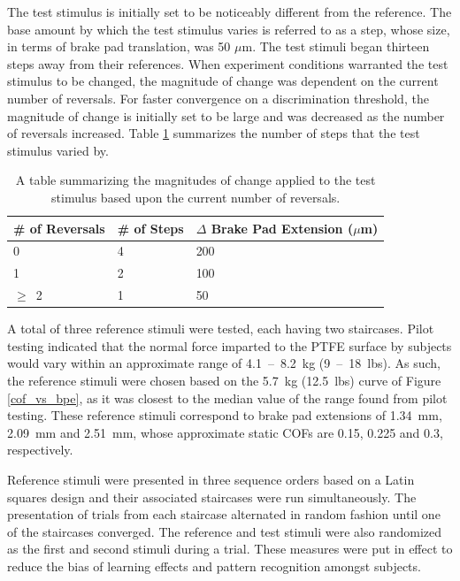 \documentclass [12pt,letterpaper]{report}
\begin{document}
The test stimulus is initially set to be noticeably different from the reference. The base amount by which the test stimulus varies is referred to as a step, whose size, in terms of brake pad translation, was 50 $\mu$m. The test stimuli began thirteen steps away from their references. When experiment conditions warranted the test stimulus to be changed, the magnitude of change was dependent on the current number of reversals. For faster convergence on a discrimination threshold, the magnitude of change is initially set to be large and was decreased as the number of reversals increased. Table \ref{reversal_table} summarizes the number of steps that the test stimulus varied by.


\begin{table}[]
\centering
\caption{A table summarizing the magnitudes of change applied to the test stimulus based upon the current number of reversals.}
\label{reversal_table}
\begin{tabular}{@{}l|ll@{}}
\toprule
\textbf{\# of Reversals} & \textbf{\# of Steps} & \textbf{$\Delta$ Brake Pad Extension (}$\mu$m\textbf{)} \\ \midrule
0                        & 4                    & 200                               \\
1                        & 2                    & 100                               \\
$\geq$~2                 & 1                    & 50                                \\ \bottomrule
\end{tabular}
\end{table}


A total of three reference stimuli were tested, each having two staircases. Pilot testing indicated that the normal force imparted to the PTFE surface by subjects would vary within an approximate range of 4.1~--~8.2~kg (9~--~18~lbs). As such, the reference stimuli were chosen based on the 5.7~kg (12.5~lbs) curve of Figure \ref{cof_vs_bpe}, as it was closest to the median value of the range found from pilot testing. These reference stimuli correspond to brake pad extensions of 1.34~mm, 2.09~mm and 2.51~mm, whose approximate static COFs are 0.15, 0.225 and 0.3, respectively.

Reference stimuli were presented in three sequence orders based on a Latin squares design and their associated staircases were run simultaneously. The presentation of trials from each staircase alternated in random fashion until one of the staircases converged. The reference and test stimuli were also randomized as the first and second stimuli during a trial. These measures were put in effect to reduce the bias of learning effects and pattern recognition amongst subjects. 
\end{document}
